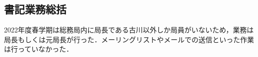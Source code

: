 \subsection*{書記業務総括}


2022年度春学期は総務局内に局長である古川以外しか局員がいないため，業務は局長もしくは元局長が行った．メーリングリストやメールでの送信といった作業は行っていなかった．
